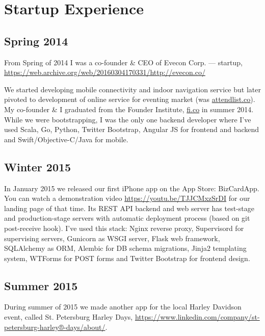 \section*{Startup Experience}

\subsection*{Spring 2014}

From Spring of 2014 I was a co-founder \& CEO of Evecon Corp. ---
startup,
\href{https://web.archive.org/web/20160304170331/http://evecon.co/}{\url{https://web.archive.org/web/20160304170331/http://evecon.co/}}

We started developing mobile connectivity and indoor navigation
service but later pivoted to development of online service for
eventing market (was \url{attendlist.co}). My co-founder \& I
graduated from the Founder Institute,
\href{https://fi.co}{\url{fi.co}} in summer 2014. While we were
bootstrapping, I was the only one backend developer where I've used
Scala, Go, Python, Twitter Bootstrap, Angular JS for frontend and
backend and Swift/Objective-C/Java for mobile.

\subsection*{Winter 2015}

In January 2015 we released our first iPhone app on the App Store:
BizCardApp. You can watch a demonstration video
\href{https://youtu.be/TJJCMxzSrDI}{\url{https://youtu.be/TJJCMxzSrDI}}
for our landing page of that time. Its REST API backend and web server
has test-stage and production-stage servers with automatic deployment
process (based on git post-receive hook). I've used this stack: Nginx
reverse proxy, Supervisord for supervising servers, Gunicorn as WSGI
server, Flask web framework, SQLAlchemy as ORM, Alembic for DB schema
migrations, Jinja2 templating system, WTForms for POST forms and
Twitter Bootstrap for frontend design.

\subsection*{Summer 2015}

During summer of 2015 we made another app for the local Harley
Davidson event, called St. Petersburg Harley Days,
\href{https://www.linkedin.com/company/st-petersburg-harley®-days/about/}{\url{https://www.linkedin.com/company/st-petersburg-harley®-days/about/}}.


